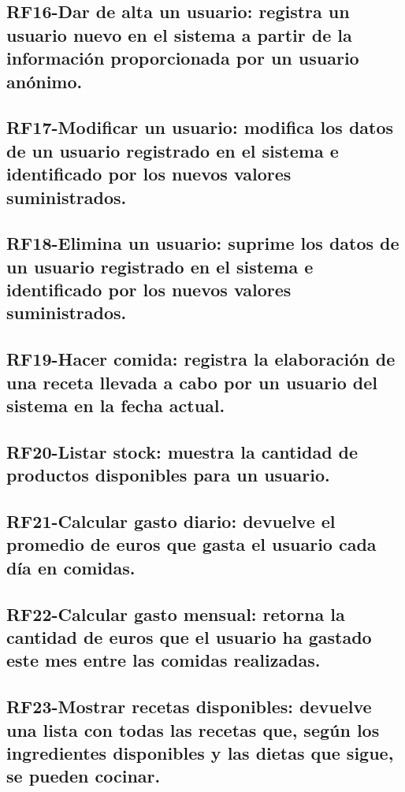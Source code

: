 \documentclass[a4paper,12pt]{report}
\begin{document}
\subsection{\textbf{RF16-Dar de alta un usuario}: registra un usuario nuevo en el sistema a partir de la información proporcionada por un usuario anónimo.}
\label{sec-2-2-16}

\subsection{\textbf{RF17-Modificar un usuario}: modifica los datos de un usuario registrado en el sistema e identificado por los nuevos valores suministrados.}
\label{sec-2-2-17}

\subsection{\textbf{RF18-Elimina un usuario}: suprime los datos de un usuario registrado en el sistema e identificado por los nuevos valores suministrados.}
\label{sec-2-2-18}

\subsection{\textbf{RF19-Hacer comida}: registra la elaboración de una receta llevada a cabo por un usuario del sistema en la fecha actual.}
\label{sec-2-2-19}

\subsection{\textbf{RF20-Listar stock}: muestra la cantidad de productos disponibles para un usuario.}
\label{sec-2-2-20}

\subsection{\textbf{RF21-Calcular gasto diario}: devuelve el promedio de euros que gasta el usuario cada día en comidas.}
\label{sec-2-2-21}

\subsection{\textbf{RF22-Calcular gasto mensual}: retorna la cantidad de euros que el usuario ha gastado este mes entre las comidas realizadas.}
\label{sec-2-2-22}

\subsection{\textbf{RF23-Mostrar recetas disponibles}: devuelve una lista con todas las recetas que, según los ingredientes disponibles y las dietas que sigue, se pueden cocinar.}
\label{sec-2-2-23}
\end{document}
